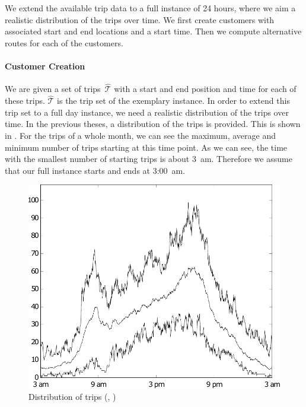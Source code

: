 We extend the available trip data to a full instance of 24 hours, where we aim a realistic distribution of the trips over time. We first create customers with associated start and end locations and a start time. Then we compute alternative routes for each of the customers.

\paragraph{Customer Creation} \parfill

We are given a set of trips~$\widehat{\mathcal{T}}$ with a start and end position and time for each of these trips. $\widehat{\mathcal{T}}$ is the trip set of the exemplary instance. In order to extend this trip set to a full day instance, we need a realistic distribution of the trips over time. In the previous theses, a distribution of the trips is provided. This is shown in . For the trips of a whole month, we can see the maximum, average and minimum number of trips starting at this time point. As we can see, the time with the smallest number of starting trips is about 3~am. Therefore we assume that our full instance starts and ends at 3:00~am.

\begin{figure}[htb]
	\centering
	\includegraphics[width=\textwidth]{graphic/Trip_Distribution}
	\caption{Distribution of trips (\cite[p.~62]{Kaiser}, \cite[p.~62]{Knoll})}
	\label{fig:trip_distribution}
\end{figure}

